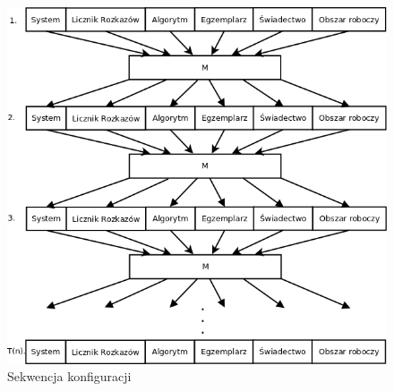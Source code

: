 \begin{figure}[tbh]
\centering
\includegraphics[width=0.75\hsize]{first_problem/configuration_sequence.png}
\caption{Sekwencja konfiguracji}
\label{configuration_sequence}
\end{figure}